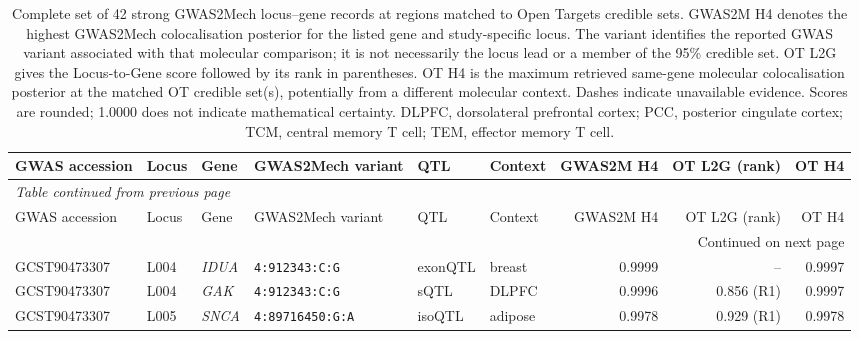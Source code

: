 \documentclass[11pt,a4paper]{article}
\begin{document}
\begin{landscape}
\begingroup
\tiny
\setlength{\tabcolsep}{3.2pt}
\renewcommand{\arraystretch}{1.12}

\begin{longtable}{@{}lllp{2.9cm}lp{3.1cm}rrr@{}}

\caption{
Complete set of 42 strong GWAS2Mech
locus--gene records at regions matched
to Open Targets credible sets.
GWAS2M H4 denotes the highest GWAS2Mech
colocalisation posterior for the listed gene
and study-specific locus. The variant
identifies the reported GWAS variant associated
with that molecular comparison; it is not
necessarily the locus lead or a member of the
95\% credible set.
OT L2G gives the Locus-to-Gene score followed
by its rank in parentheses.
OT H4 is the maximum retrieved same-gene
molecular colocalisation posterior at the
matched OT credible set(s), potentially
from a different molecular context.
Dashes indicate unavailable evidence.
Scores are rounded; 1.0000 does not indicate
mathematical certainty. DLPFC, dorsolateral
prefrontal cortex; PCC, posterior cingulate
cortex; TCM, central memory T cell;
TEM, effector memory T cell.
}
\label{tab:step13_genes_full}\\

\toprule
GWAS accession &
Locus &
Gene &
GWAS2Mech variant &
QTL &
Context &
GWAS2M H4 &
OT L2G (rank) &
OT H4 \\
\midrule
\endfirsthead

\multicolumn{9}{l}{
\textit{Table continued from previous page}}\\
\toprule
GWAS accession &
Locus &
Gene &
GWAS2Mech variant &
QTL &
Context &
GWAS2M H4 &
OT L2G (rank) &
OT H4 \\
\midrule
\endhead

\midrule
\multicolumn{9}{r}{Continued on next page}\\
\endfoot

\bottomrule
\endlastfoot

GCST90473307 & L004 & \textit{IDUA} &
\texttt{4:912343:C:G} &
exonQTL & breast &
0.9999 & -- & 0.9997 \\

GCST90473307 & L004 & \textit{GAK} &
\texttt{4:912343:C:G} &
sQTL & DLPFC &
0.9996 & 0.856 (R1) & 0.9997 \\

GCST90473307 & L005 & \textit{SNCA} &
\texttt{4:89716450:G:A} &
isoQTL & adipose &
0.9978 & 0.929 (R1) & 0.9978 \\


\end{longtable}
\end{landscape}
\end{document}
